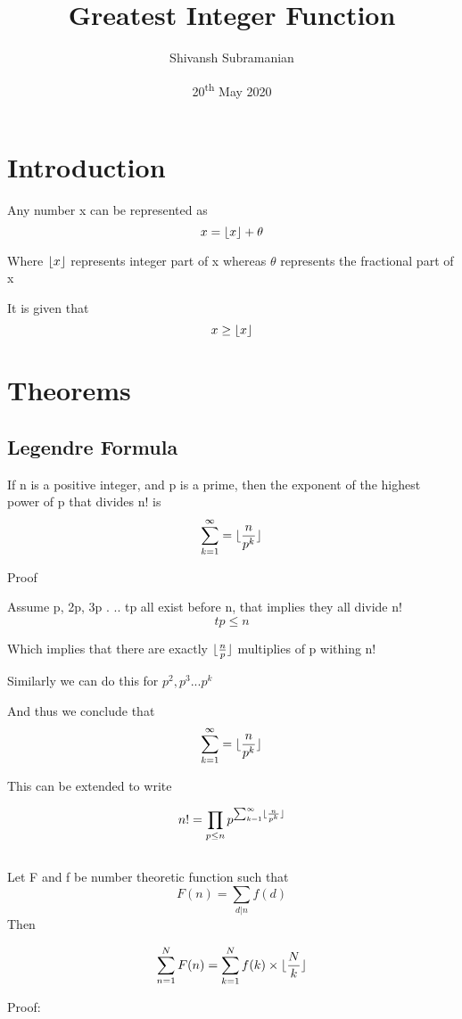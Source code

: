 \documentclass{article}
\title{Greatest Integer Function}
\author{Shivansh Subramanian}
\date{20\textsuperscript{th} May 2020}
\DeclarePairedDelimiter{\floor}{\lfloor}{\rfloor}
\begin{document}
\maketitle

\section{Introduction}

Any number x can be represented as 
\[
    x = \floor*{x} + \theta
\]


Where \(\floor*{x}\) represents integer part of x whereas \(\theta\) represents the fractional part of x

It is given that
\[
    x \geq \floor*{x}
\]

\section{Theorems}
 
\subsection{Legendre Formula}
If n is a positive integer, and p is a prime, then the exponent of the highest power of p that divides n! is
\[
    \sum_{k=1}^{\infty} = \floor{\frac{n}{p^k}}
\]

Proof

Assume p, 2p, 3p . .. tp all exist before n, that implies they all divide n!
\[
    tp \leq n
\]

Which implies that there are exactly \(\floor{\frac{n}{p} }\) multiplies of p withing n!

Similarly we can do this for \(p^2, p^3 . .. p^k\)

And thus we conclude that
\[
    \sum_{k=1}^{\infty} = \floor{\frac{n}{p^k}}
\]

This can be extended to write

\[
    n! = \prod_{p\leq n} p^{\sum_{k=1}^{\infty} \floor{\frac{n}{p^k}}}
\]


\subsection{}

Let F and f be number theoretic function such that
\[F(n) = \sum_{d\vert n} f(d) \]
Then 

\[
    \sum_{n=1}^{N}F(n) = \sum_{k=1}^{N} f(k) \times \floor{\frac{N}{k}}
\]

Proof:
\end{document}
